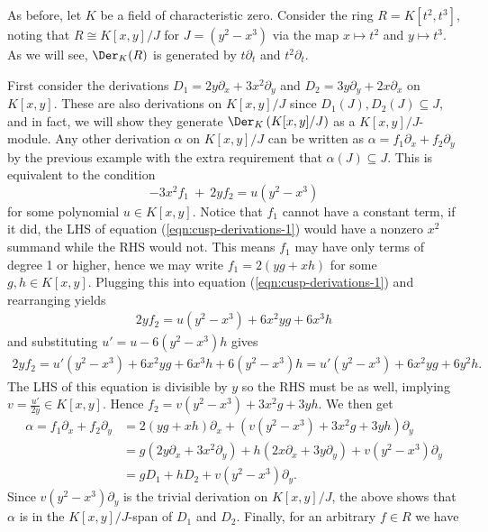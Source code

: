 \begin{example}\label{example:cusp-derivations}
	As before, let $K$ be a field of characteristic zero. Consider the ring $R = K[t^2,t^3]$, noting that $R \cong K[x,y]/J$ for $J = (y^2 - x^3)$ via the map $x\mapsto t^2$ and $y\mapsto t^3$. As we will see, $\Der_K(R)$ is generated by $t\partial_t$ and $t^2\partial_t$.

	First consider the derivations $D_1 = 2y\partial_x + 3x^2\partial_y$ and $D_2 = 3y\partial_y + 2x\partial_x$ on $K[x,y]$. These are also derivations on $K[x,y]/J$ since $D_1(J), D_2(J) \subseteq J$, and in fact, we will show they generate $\Der_K \left(K[x,y]/J\right)$ as a $K[x,y]/J$-module. Any other derivation $\alpha$ on $K[x,y]/J$ can be written as $\alpha = f_1\partial_x + f_2\partial_y$ by the previous example with the extra requirement that $\alpha(J)\subseteq J$. This is equivalent to the condition
	\begin{equation}\label{eqn:cusp-derivations-1}
		-3x^2f_1 ~+~ 2yf_2 = u(y^2 - x^3)
	\end{equation}
	for some polynomial $u \in K[x,y]$. Notice that $f_1$ cannot have a constant term, if it did, the LHS of equation (\ref{eqn:cusp-derivations-1}) would have a nonzero $x^2$ summand while the RHS would not. This means $f_1$ may have only terms of degree 1 or higher, hence we may write $f_1 = 2(yg + xh)$ for some $g, h \in K[x,y]$. Plugging this into equation (\ref{eqn:cusp-derivations-1}) and rearranging yields
	\begin{align*}
		2yf_2 = u(y^2 - x^3) + 6x^2yg + 6x^3h
	\end{align*}
	and substituting $u' = u - 6(y^2 - x^3)h$ gives
	\begin{align*}
		2yf_2 = u'(y^2 - x^3) + 6x^2yg + 6x^3h + 6(y^2 - x^3)h = u'(y^2 - x^3) + 6x^2yg + 6y^2h.
	\end{align*}
	The LHS of this equation is divisible by $y$ so the RHS must be as well, implying $v = \frac{u'}{2y} \in K[x,y]$. Hence $f_2 = v(y^2 - x^3) + 3x^2g + 3yh$. We then get
	\begin{align*}
		\alpha = f_1\partial_x + f_2\partial_y 
		  &= 2(yg + xh)\partial_x + \left(v(y^2 - x^3) + 3x^2g + 3yh\right) \partial_y \\
		  &= g(2y\partial_x + 3x^2\partial_y) + h(2x\partial_x + 3y\partial_y) + v(y^2-x^3)\partial_y \\
		  &= gD_1 + hD_2 + v(y^2 - x^3)\partial_y.
	\end{align*}
	Since $v(y^2-x^3)\partial_y$ is the trivial derivation on $K[x,y]/J$, the above shows that $\alpha$ is in the $K[x,y]/J$-span of $D_1$ and $D_2$. Finally, for an arbitrary $f \in R$ we have

\end{example}
